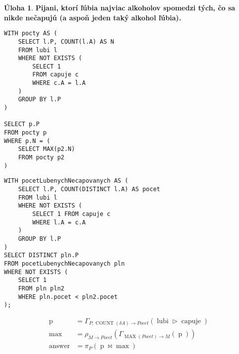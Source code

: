 \documentclass[10pt, a4paper]{article}
\theoremstyle{definition}
\newtheorem{problem}{Úloha}[section]
\DeclareMathOperator{\join}{\bowtie}
\DeclareMathOperator{\antijoin}{\rhd}
\DeclareMathOperator{\COUNT}{\textrm{COUNT}}
\DeclareMathOperator{\MAX}{\textrm{MAX}}
\DeclareMathOperator{\lubi}{lubi}
\DeclareMathOperator{\capuje}{capuje}
\DeclareMathOperator{\answer}{answer}
\begin{document}
\begin{problem}
{\bf Pijani, ktorí ľúbia najviac alkoholov spomedzi tých, čo sa nikde nečapujú (a aspoň jeden taký alkohol ľúbia).}

\begin{minipage}{0.49\textwidth}
\begin{verbatim}
WITH pocty AS (
    SELECT l.P, COUNT(l.A) AS N
    FROM lubi l
    WHERE NOT EXISTS (
        SELECT 1
        FROM capuje c
        WHERE c.A = l.A
    )
    GROUP BY l.P
)

SELECT p.P
FROM pocty p
WHERE p.N = (
    SELECT MAX(p2.N)
    FROM pocty p2
)
\end{verbatim}
\end{minipage}
\begin{minipage}{0.49\textwidth}
\begin{verbatim}
WITH pocetLubenychNecapovanych AS (
    SELECT l.P, COUNT(DISTINCT l.A) AS pocet
    FROM lubi l
    WHERE NOT EXISTS (
        SELECT 1 FROM capuje c
        WHERE l.A = c.A
    )
    GROUP BY l.P
)
SELECT DISTINCT pln.P
FROM pocetLubenychNecapovanych pln
WHERE NOT EXISTS (
    SELECT 1
    FROM pln pln2
    WHERE pln.pocet < pln2.pocet
);
\end{verbatim}
\end{minipage}
\begin{align*}
\operatorname{p} & = \Gamma_{P; \COUNT(\delta A)\rightarrow Pocet}(\lubi\antijoin\capuje)\\
\operatorname{max} & = \rho_{M\rightarrow Pocet}(\Gamma_{\MAX(Pocet)\rightarrow M}(\operatorname{p}))\\
\answer &  = \pi_P (\operatorname{p}\join \operatorname{max})
\end{align*}
\end{problem}
\end{document}

